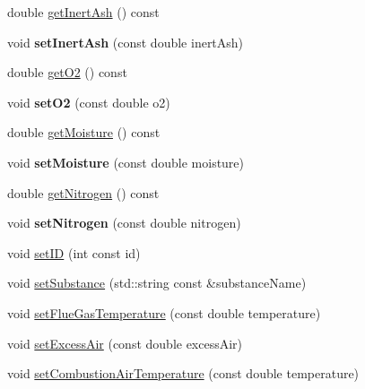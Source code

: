 \begin{DoxyCompactItemize}
\item 
double \hyperlink{class_solid_liquid_flue_gas_material_a0549b32b7b5423267d5f59cc96b98127}{get\+Inert\+Ash} () const
\item 
\mbox{\label{class_solid_liquid_flue_gas_material_a75a066ed50d810d5699fd53cb4376dc8}} 
void {\bfseries set\+Inert\+Ash} (const double inert\+Ash)
\item 
double \hyperlink{class_solid_liquid_flue_gas_material_a08d588e576f605d3f9925cb649e1105e}{get\+O2} () const
\item 
\mbox{\label{class_solid_liquid_flue_gas_material_afb57fdbeeccdb58fffec6d6446891409}} 
void {\bfseries set\+O2} (const double o2)
\item 
double \hyperlink{class_solid_liquid_flue_gas_material_accf3c8be942d0ba244f6eabab6e7012b}{get\+Moisture} () const
\item 
\mbox{\label{class_solid_liquid_flue_gas_material_ac811fd9fee43bc497dc53c1e55c17fea}} 
void {\bfseries set\+Moisture} (const double moisture)
\item 
double \hyperlink{class_solid_liquid_flue_gas_material_a76159a5d9d609f0e0131f7bca3b60ebc}{get\+Nitrogen} () const
\item 
\mbox{\label{class_solid_liquid_flue_gas_material_a7082dd41a06397a8ae714096c091bfbe}} 
void {\bfseries set\+Nitrogen} (const double nitrogen)
\item 
void \hyperlink{class_solid_liquid_flue_gas_material_a6046d06703bd496745121b62eab4f40f}{set\+ID} (int const id)
\item 
void \hyperlink{class_solid_liquid_flue_gas_material_a54be915432c1300c4d8eaf7bf2be361f}{set\+Substance} (std\+::string const \&substance\+Name)
\item 
void \hyperlink{class_solid_liquid_flue_gas_material_ae647700dbff5ccea7938b2117f2c3156}{set\+Flue\+Gas\+Temperature} (const double temperature)
\item 
void \hyperlink{class_solid_liquid_flue_gas_material_a7a3f9f77d267afc05f5fde1da9329ec5}{set\+Excess\+Air} (const double excess\+Air)
\item 
void \hyperlink{class_solid_liquid_flue_gas_material_a626dfbc9ba87abff99e5c5a8204d69c6}{set\+Combustion\+Air\+Temperature} (const double temperature)

\end{DoxyCompactItemize}
